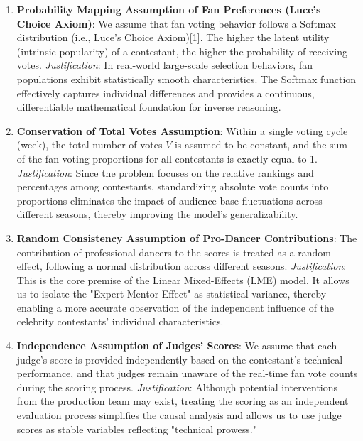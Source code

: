 \documentclass[12pt]{article}
\begin{document}
	\begin{enumerate}
		\item \textbf{Probability Mapping Assumption of Fan Preferences (Luce's Choice Axiom)}: We assume that fan voting behavior follows a Softmax distribution (i.e., Luce’s Choice Axiom)[1]. The higher the latent utility (intrinsic popularity) of a contestant, the higher the probability of receiving votes.
		\textit{Justification}: In real-world large-scale selection behaviors, fan populations exhibit statistically smooth characteristics. The Softmax function effectively captures individual differences and provides a continuous, differentiable mathematical foundation for inverse reasoning.
		
		\item \textbf{Conservation of Total Votes Assumption}: Within a single voting cycle (week), the total number of votes $V$ is assumed to be constant, and the sum of the fan voting proportions for all contestants is exactly equal to 1.
		\textit{Justification}: Since the problem focuses on the relative rankings and percentages among contestants, standardizing absolute vote counts into proportions eliminates the impact of audience base fluctuations across different seasons, thereby improving the model's generalizability.
		
		\item \textbf{Random Consistency Assumption of Pro-Dancer Contributions}: The contribution of professional dancers to the scores is treated as a random effect, following a normal distribution across different seasons.
		\textit{Justification}: This is the core premise of the Linear Mixed-Effects (LME) model. It allows us to isolate the "Expert-Mentor Effect" as statistical variance, thereby enabling a more accurate observation of the independent influence of the celebrity contestants' individual characteristics.
		
		\item \textbf{Independence Assumption of Judges' Scores}: We assume that each judge's score is provided independently based on the contestant's technical performance, and that judges remain unaware of the real-time fan vote counts during the scoring process.
		\textit{Justification}: Although potential interventions from the production team may exist, treating the scoring as an independent evaluation process simplifies the causal analysis and allows us to use judge scores as stable variables reflecting "technical prowess."
	\end{enumerate}
	
\end{document}
